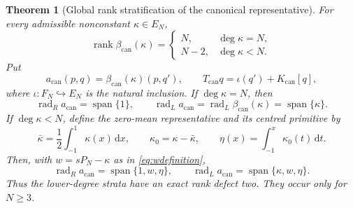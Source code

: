\documentclass[11pt,a4paper]{article}
\newtheorem{theorem}{Theorem}[section]
\theoremstyle{definition}
\theoremstyle{remark}
\newcommand{\rank}{\operatorname{rank}}
\newcommand{\Rad}{\operatorname{rad}}
\newcommand{\spanof}{\operatorname{span}}
\newcommand{\dd}{\,\mathrm{d}}
\begin{document}
\begin{theorem}[Global rank stratification of the canonical representative]
\label{thm:globalcanonicalrank}
For every admissible nonconstant $\kappa\in E_N$,
\begin{equation}\label{eq:globalcanonicalrank}
 \boxed{
 \rank\beta_{\mathrm{can}}(\kappa)
 =
 \begin{cases}
  N,   & \deg\kappa=N,\\
  N-2, & \deg\kappa<N.
 \end{cases}}
\end{equation}
Put
\begin{equation}\label{eq:acanoperator}
 a_{\mathrm{can}}(p,q)=\beta_{\mathrm{can}}(\kappa)(p,q'),
 \qquad
 T_{\mathrm{can}}q=\iota(q')+K_{\mathrm{can}}[q],
\end{equation}
where $\iota:F_N\hookrightarrow E_N$ is the natural inclusion.
If $\deg\kappa=N$, then
\begin{equation}\label{eq:canonicalradicalexact}
 \Rad_Ra_{\mathrm{can}}=\spanof\{1\},
 \qquad
 \Rad_La_{\mathrm{can}}=\Rad_L\beta_{\mathrm{can}}(\kappa)
 =\spanof\{\kappa\}.
\end{equation}
If $\deg\kappa<N$, define the zero-mean representative and its centred primitive by
\begin{equation}\label{eq:kappa0eta}
 \bar\kappa=\frac12\int_{-1}^{1}\kappa(x)\dd x,
 \qquad
 \kappa_0=\kappa-\bar\kappa,
 \qquad
 \eta(x)=\int_{-1}^{x}\kappa_0(t)\dd t.
\end{equation}
Then, with $w=sP_N-\kappa$ as in \eqref{eq:wdefinition},
\begin{equation}\label{eq:lowerdegreeradicals}
 \boxed{
 \Rad_Ra_{\mathrm{can}}=\spanof\{1,w,\eta\},
 \qquad
 \Rad_La_{\mathrm{can}}=\spanof\{\kappa,w,\eta\}.}
\end{equation}
Thus the lower-degree strata have an exact rank defect two.  They occur only for $N\geq3$.
\end{theorem}
\end{document}
